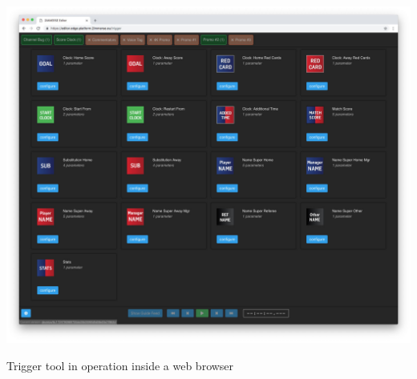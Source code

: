 \documentclass[sigchi-a, authorversion]{acmart}
\begin{document}
\begin{marginfigure}
    \vspace{-6.5cm}
    \includegraphics[width=\marginparwidth-10pt]{Figures/triggertool.jpg}
    \caption{Trigger tool in operation inside a web browser}
    \label{fig:triggertool}
\end{marginfigure}
\end{document}
